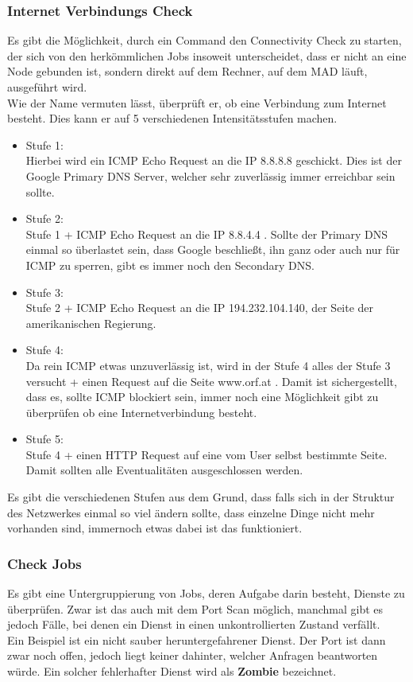 \documentclass[12pt,a4paper]{report}
\begin{document}
\subsubsection{Internet Verbindungs Check}
Es gibt die Möglichkeit, durch ein Command den Connectivity Check zu starten, der sich von den herkömmlichen Jobs insoweit unterscheidet, dass er nicht an eine Node gebunden ist, sondern direkt auf dem Rechner, auf dem MAD läuft, ausgeführt wird.\\
Wie der Name vermuten lässt, überprüft er, ob eine Verbindung zum Internet besteht. Dies kann er auf 5 verschiedenen Intensitätsstufen machen.\\
\begin{itemize}
\item Stufe 1:\\
Hierbei wird ein ICMP Echo Request an die IP 8.8.8.8 geschickt. Dies ist der Google Primary DNS Server, welcher sehr zuverlässig immer erreichbar sein sollte.
\item Stufe 2:\\
Stufe 1 + ICMP Echo Request an die IP 8.8.4.4 . Sollte der Primary DNS einmal so überlastet sein, dass Google beschließt, ihn ganz oder auch nur für ICMP zu sperren, gibt es immer noch den Secondary DNS.
\item Stufe 3:\\
Stufe 2 + ICMP Echo Request an die IP 194.232.104.140, der Seite der amerikanischen Regierung. 
\item Stufe 4:\\
Da rein ICMP etwas unzuverlässig ist, wird in der Stufe 4 alles der Stufe 3 versucht + einen Request auf die Seite www.orf.at . Damit ist sichergestellt, dass es, sollte ICMP blockiert sein, immer noch eine Möglichkeit gibt zu überprüfen ob eine Internetverbindung besteht.
\item Stufe 5:\\
Stufe 4 + einen HTTP Request auf eine vom User selbst bestimmte Seite. Damit sollten alle Eventualitäten ausgeschlossen werden. 
\end{itemize}

Es gibt die verschiedenen Stufen aus dem Grund, dass falls sich in der Struktur des Netzwerkes einmal so viel ändern sollte, dass einzelne Dinge nicht mehr vorhanden sind, immernoch etwas dabei ist das funktioniert.

\subsubsection{Check Jobs}
Es gibt eine Untergruppierung von Jobs, deren Aufgabe darin besteht, Dienste zu überprüfen. Zwar ist das auch mit dem Port Scan möglich, manchmal gibt es jedoch Fälle, bei denen ein Dienst in einen unkontrollierten Zustand verfällt.\\
Ein Beispiel ist ein nicht sauber heruntergefahrener Dienst. Der Port ist dann zwar noch offen, jedoch liegt keiner dahinter, welcher Anfragen beantworten würde. Ein solcher fehlerhafter Dienst wird als \textbf{Zombie} bezeichnet.\\
\end{document}
